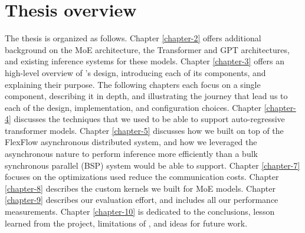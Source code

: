 \section{Thesis overview}
The thesis is organized as follows. Chapter \ref{chapter-2} offers additional background on the MoE architecture, the Transformer and GPT architectures, and existing inference systems for these models. Chapter \ref{chapter-3} offers an high-level overview of \Project's design, introducing each of its components, and explaining their purpose. The following chapters each focus on a single component, describing it in depth, and illustrating the journey that lead us to each of the design, implementation, and configuration choices. Chapter \ref{chapter-4} discusses the techniques that we used to be able to support auto-regressive transformer models. Chapter \ref{chapter-5} discusses how we built \Project on top of the FlexFlow asynchronous distributed system, and how we leveraged the asynchronous nature to perform inference more efficiently than a bulk synchronous parallel (BSP) system would be able to support. %
Chapter \ref{chapter-7} focuses on the optimizations used reduce the communication costs. Chapter \ref{chapter-8} describes the custom kernels we built for MoE models. Chapter \ref{chapter-9} describes our evaluation effort, and includes all our performance measurements. Chapter \ref{chapter-10} is dedicated to the conclusions, lesson learned from the project, limitations of \Project, and ideas for future work. 